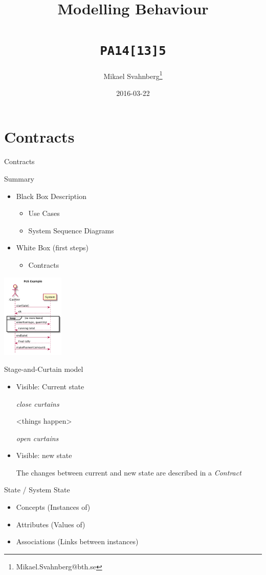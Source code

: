 \documentclass[10pt,t,a4paper]{beamer}
\author{Mikael Svahnberg\thanks{Mikael.Svahnberg@bth.se}}
\date{2016-03-22}
\title{Modelling Behaviour \\\\ \texttt{PA14[13]5}}
\begin{document}
\maketitle

\section{Contracts}
\label{sec-1}
\begin{frame}[label=sec-1-1]{Contracts}
\end{frame}
\begin{frame}[label=sec-1-2]{Summary}
\begin{itemize}
\item Black Box Description
\begin{itemize}
\item Use Cases
\item System Sequence Diagrams
\end{itemize}
\item White Box (first steps)
\begin{itemize}
\item Contracts
\end{itemize}
\end{itemize}
\includegraphics[height=4cm]{./FSystemSequenceDiagramExample.png}
\end{frame}
\begin{frame}[label=sec-1-3]{Stage-and-Curtain model}
\begin{itemize}
\item Visible: Current state

\emph{close curtains}

<things happen>

\emph{open curtains}

\item Visible: new state

The changes between current and new state are described in a \emph{Contract}
\end{itemize}
\end{frame}
\begin{frame}[label=sec-1-4]{State / System State}
\begin{itemize}
\item Concepts (Instances of)
\item Attributes (Values of)
\item Associations (Links between instances)
\end{itemize}
\end{frame}
\end{document}

